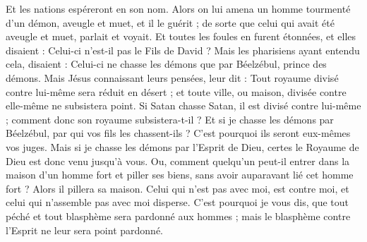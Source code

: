 \begin{multicols}{2}
Et les nations espéreront en son nom{}.
Alors on lui amena un homme tourmenté d'un démon, aveugle et muet, et il le guérit ; de sorte que celui qui avait été aveugle et muet, parlait et voyait.
Et toutes les foules en furent étonnées, et elles disaient : Celui-ci n'est-il pas le Fils de David ?
Mais les pharisiens ayant entendu cela, disaient : Celui-ci ne chasse les démons que par Béelzébul, prince des démons.
Mais Jésus connaissant leurs pensées, leur dit : Tout royaume divisé contre lui-même sera réduit en désert ; et toute ville, ou maison, divisée contre elle-même ne subsistera point.
Si Satan chasse Satan, il est divisé contre lui-même ; comment donc son royaume subsistera-t-il ?
Et si je chasse les démons par Béelzébul, par qui vos fils les chassent-ils ? C’est pourquoi ils seront eux-mêmes vos juges.
Mais si je chasse les démons par l'Esprit de Dieu, certes le Royaume de Dieu est donc venu jusqu'à vous.
Ou, comment quelqu'un peut-il entrer dans la maison d'un homme fort et piller ses biens, sans avoir auparavant lié cet homme fort ? Alors il pillera sa maison.
Celui qui n'est pas avec moi, est contre moi, et celui qui n'assemble pas avec moi disperse.
C'est pourquoi je vous dis, que tout péché et tout blasphème sera pardonné aux hommes ; mais le blasphème contre l'Esprit ne leur sera point pardonné.

\end{multicols}
